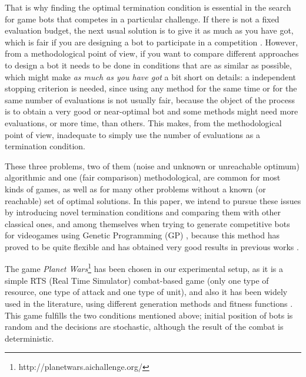 \documentclass[runningheads,a4paper]{llncs}
\begin{document}
That is why finding the optimal termination condition is essential in the search for game bots that competes in a particular challenge. If there is not a fixed evaluation budget, the next usual solution is to give it as much as you have got, 
which is fair if you are designing a bot %
to participate in a competition
\cite{DBLP:conf/cec/Fernandez-AresMGGF11:anon}. However, from a
methodological point of view, if you want to compare different
approaches to design a bot it needs to be done in conditions that are
as similar as possible, which  
might make {\em as much as you have got} a bit short on
details: a independent stopping criterion is needed, since using any method for the same
time or for the same number of evaluations is not usually fair,
because the object of the process is to obtain a very good or
near-optimal bot and some methods might need more evaluations, or more
time, than others. 
This makes, from the methodological point of view, inadequate to simply use the
number of evaluations as a termination condition.

These three problems, two of them (noise and unknown or unreachable optimum)
algorithmic and one (fair comparison) methodological, are
common for most kinds of games, as well as for many other
problems without a known (or reachable) set of optimal solutions. In
this paper, we intend to pursue these issues by introducing novel 
termination conditions and comparing them with other classical
ones, and among themselves when trying to generate competitive bots
for videogames using Genetic Programming (GP) \cite{GP_Koza92},
because this method has proved to be quite flexible and has obtained
very good results in previous works \cite{EvoStar2014:GPBot:anon}.%

The game \textit{Planet Wars}\footnote{http://planetwars.aichallenge.org/}
 has been chosen in our experimental setup, as it is a simple RTS (Real Time Simulator) combat-based game (only one type of resource, one type of attack and one type of unit), and also it has been widely used in the literature, using different generation methods and fitness functions 
\cite{DBLP:journals/jcst/MoraFGGF12,DBLP:conf/cec/Fernandez-AresMGGF11,DBLP:journals/nc/Lara-CabreraCL14,NogueiraCoevolutionary14}. This
game fulfills the two conditions mentioned above; initial position of
bots is random and the decisions are stochastic, although the result
of the combat is deterministic. 
\end{document}
